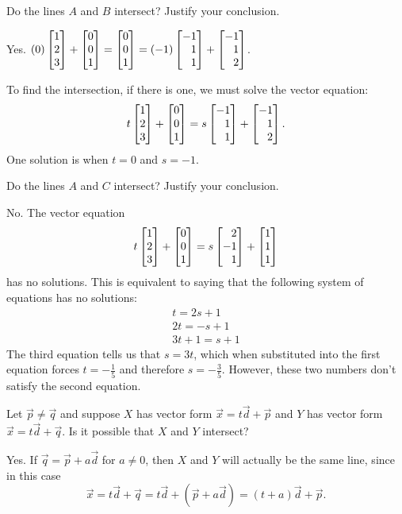 	\begin{parts}
		\item Do the lines $A$ and $B$ intersect? Justify your conclusion.
			\begin{solution}
				Yes. $(0)\mat{1\\2\\3}+\mat{0\\0\\1} = \mat{0\\0\\1} = (-1)\mat{-1\\1\\1}+\mat{-1\\1\\2}$.

				To find the intersection, if there is one, we must solve the vector equation:
				\[
					t\mat{1\\2\\3}+\mat{0\\0\\1} = s\mat{-1\\1\\1}+\mat{-1\\1\\2}.
				\]
				One solution is when $t = 0$ and $s = -1$.
			\end{solution}
		\item Do the lines $A$ and $C$ intersect? Justify your conclusion.
			\begin{solution}
				No. The vector equation
				\[
					t\mat{1\\2\\3}+\mat{0\\0\\1} = s\mat{2\\-1\\1}+\mat{1\\1\\1}
				\]
				has no solutions. This is equivalent to saying that the following
				system of equations has no solutions:
				\begin{gather*}
					t = 2s + 1 \\
					2t = -s + 1 \\
					3t + 1 = s + 1
				\end{gather*}
				The third equation tells us that $s = 3t$, which when substituted
				into the first equation forces $t = -\tfrac{1}{5}$ and therefore
				$s = -\tfrac{3}{5}$. However, these two numbers don't satisfy the second
				equation.
			\end{solution}
		\item Let $\vec p\neq \vec q$ and suppose
			$X$ has vector form $\vec x=t\vec d+\vec p$ and $Y$ has
			vector form $\vec x=t\vec d+\vec q$. Is it possible
			that $X$ and $Y$ intersect?
			\begin{solution}
				Yes. If $\vec q=\vec p+a\vec d$ for $a\neq 0$, then $X$ and $Y$
				will actually be the same line, since in this case
				\[
					\vec x = t\vec d+\vec q
					= t\vec d+(\vec p+a\vec d)
					= (t+a)\vec d+\vec p.
				\]


\end{solution}
\end{parts}
